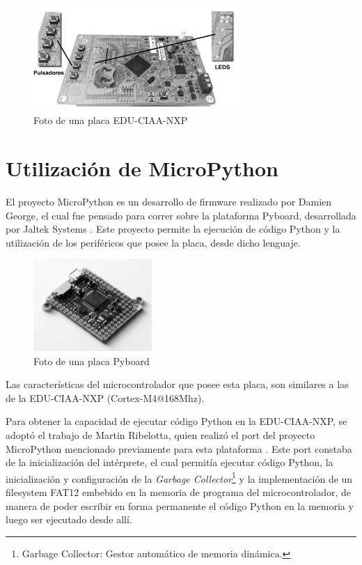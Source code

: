 \begin{figure}[h]
  \centering
    \includegraphics[width=0.7\textwidth]{Figures/fig_educiaa_placa}
  \caption{Foto de una placa EDU-CIAA-NXP}
  \label{fig:educiaaPlaca}
\end{figure}


\section{Utilización de MicroPython}
\label{sec:micropython}

El proyecto MicroPython \cite{micropython} es un desarrollo de firmware realizado por Damien George, el cual fue pensado para correr sobre la plataforma Pyboard, desarrollada por Jaltek Systems \cite{jaltek}. Este proyecto permite la ejecución de código Python y la utilización de los periféricos que posee la placa, desde dicho lenguaje.

\begin{figure}[ht]
  \centering
    \includegraphics[width=0.4\textwidth]{Figures/fig_pyboard}
  \caption{Foto de una placa Pyboard}
  \label{fig:pyboardPlaca}
\end{figure}

Las características del microcontrolador que posee esta placa, son similares a las de la EDU-CIAA-NXP (Cortex-M4@168Mhz).

Para obtener la capacidad de ejecutar código Python en la EDU-CIAA-NXP, se adoptó el trabajo de Martin Ribelotta, quien realizó el port del proyecto MicroPython mencionado previamente para esta plataforma \cite{portmicropythonribelotta}.
Este port constaba de la inicialización del intérprete, el cual permitía ejecutar código Python, la inicialización y configuración de la \textit{Garbage Collector}\footnote{Garbage Collector: Gestor automático de memoria dinámica.} y la implementación de un filesystem FAT12 embebido en la memoria de programa del microcontrolador, de manera de poder escribir en forma permanente el código Python en la memoria y luego ser ejecutado desde allí. 

